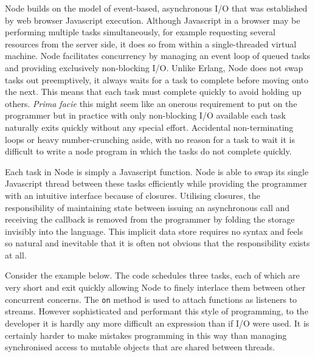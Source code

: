\documentclass[12pt, ]{article}
\begin{document}
Node builds on the model of event-based, asynchronous I/O that was
established by web browser Javascript execution. Although Javascript in
a browser may be performing multiple tasks simultaneously, for example
requesting several resources from the server side, it does so from
within a single-threaded virtual machine. Node facilitates concurrency
by managing an event loop of queued tasks and providing exclusively
non-blocking I/O. Unlike Erlang, Node does not swap tasks out
preemptively, it always waits for a task to complete before moving onto
the next. This means that each task must complete quickly to avoid
holding up others. \emph{Prima facie} this might seem like an onerous
requirement to put on the programmer but in practice with only
non-blocking I/O available each task naturally exits quickly without any
special effort. Accidental non-terminating loops or heavy
number-crunching aside, with no reason for a task to wait it is
difficult to write a node program in which the tasks do not complete
quickly.

Each task in Node is simply a Javascript function. Node is able to swap
its single Javascript thread between these tasks efficiently while
providing the programmer with an intuitive interface because of
closures. Utilising closures, the responsibility of maintaining state
between issuing an asynchronous call and receiving the callback is
removed from the programmer by folding the storage invisibly into the
language. This implicit data store requires no syntax and feels so
natural and inevitable that it is often not obvious that the
responsibility exists at all.

Consider the example below. The code schedules three tasks, each of
which are very short and exit quickly allowing Node to finely interlace
them between other concurrent concerns. The \texttt{on} method is used
to attach functions as listeners to streams. However sophisticated and
performant this style of programming, to the developer it is hardly any
more difficult an expression than if I/O were used. It is certainly
harder to make mistakes programming in this way than managing
synchronised access to mutable objects that are shared between threads.
\end{document}
